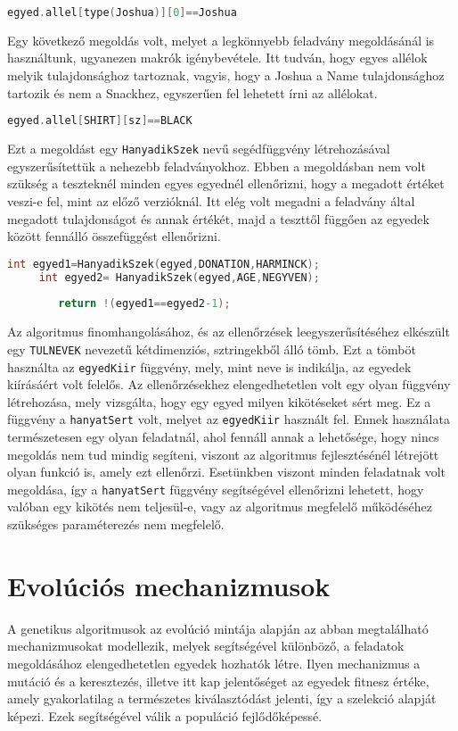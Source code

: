 \documentclass[12ppt,a4paper,oneside]{report}
\begin{document}
	\begin{lstlisting}[frame=single, language=C]
	egyed.allel[type(Joshua)][0]==Joshua
	\end{lstlisting}


	Egy következő megoldás volt, melyet a legkönnyebb feladvány megoldásánál is használtunk, ugyanezen makrók igénybevétele. Itt tudván, hogy egyes allélok melyik tulajdonsághoz tartoznak, vagyis, hogy a Joshua a Name tulajdonsághoz tartozik és nem a Snackhez, egyszerűen fel lehetett írni az allélokat.
	\begin{lstlisting}[frame=single, language=C]
	egyed.allel[SHIRT][sz]==BLACK
	\end{lstlisting}

	Ezt a megoldást egy \texttt{HanyadikSzek} nevű segédfüggvény létrehozásával egyszerűsítettük a nehezebb feladványokhoz. Ebben a megoldásban nem volt szükség a teszteknél minden egyes egyednél ellenőrizni, hogy a megadott értéket veszi-e fel, mint az előző verzióknál. Itt elég volt megadni a feladvány által megadott tulajdonságot és annak értékét, majd a teszttől függően az egyedek között fennálló összefüggést ellenőrizni.
	\begin{lstlisting}[frame=single, language=C]
  	  int egyed1=HanyadikSzek(egyed,DONATION,HARMINCK);
   	 int egyed2= HanyadikSzek(egyed,AGE,NEGYVEN);
	
		return !(egyed1==egyed2-1);
	\end{lstlisting}


	Az algoritmus finomhangolásához, és az ellenőrzések leegyszerűsítéséhez elkészült egy \texttt{TULNEVEK} nevezetű kétdimenziós, sztringekből álló tömb. Ezt a tömböt használta az \texttt{egyedKiir} függvény, mely, mint neve is indikálja, az egyedek kiírásáért volt felelős. Az ellenőrzésekhez elengedhetetlen volt egy olyan függvény létrehozása, mely vizsgálta, hogy egy egyed milyen kikötéseket sért meg. Ez a függvény a \texttt{hanyatSert} volt, melyet az \texttt{egyedKiir} használt fel. Ennek használata természetesen egy olyan feladatnál, ahol fennáll annak a lehetősége, hogy nincs megoldás nem tud mindig segíteni, viszont az algoritmus fejlesztésénél létrejött olyan funkció is, amely ezt ellenőrzi.
Esetünkben viszont minden feladatnak volt megoldása, így a \texttt{hanyatSert} függvény segítségével ellenőrizni lehetett, hogy valóban egy kikötés nem teljesül-e, vagy az algoritmus megfelelő működéséhez szükséges paraméterezés nem megfelelő.


    \section{Evolúciós mechanizmusok} %
       		A genetikus algoritmusok az evolúció mintája alapján az abban megtalálható mechanizmusokat modellezik, melyek segítségével különböző, a feladatok megoldásához elengedhetetlen egyedek hozhatók létre.
Ilyen mechanizmus a mutáció és a keresztezés, illetve itt kap jelentőséget az egyedek fitnesz értéke, amely gyakorlatilag a természetes kiválasztódást jelenti, így a szelekció alapját képezi. Ezek segítségével válik a populáció fejlődőképessé. 
\end{document}
